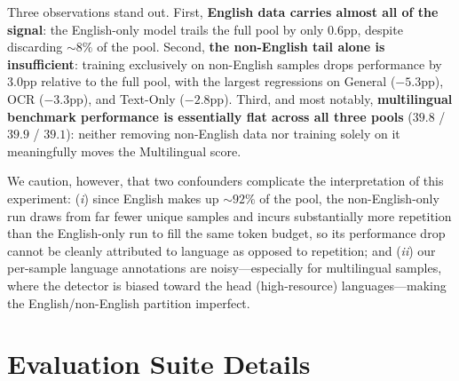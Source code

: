 Three observations stand out. First, \textbf{English data carries almost all of the signal}: the English-only model trails the full pool by only $0.6$pp, despite discarding ${\sim}8\%$ of the pool. Second, \textbf{the non-English tail alone is insufficient}: training exclusively on non-English samples drops performance by $3.0$pp relative to the full pool, with the largest regressions on General ($-5.3$pp), OCR ($-3.3$pp), and Text-Only ($-2.8$pp). Third, and most notably, \textbf{multilingual benchmark performance is essentially flat across all three pools} ($39.8$ / $39.9$ / $39.1$): neither removing non-English data nor training solely on it meaningfully moves the Multilingual score. 

We caution, however, that two confounders complicate the interpretation of this experiment: (\textit{i})
  since English makes up ${\sim}92\%$ of the pool, the non-English-only run draws from far fewer unique
  samples and incurs substantially more repetition than the English-only run to fill the same token budget, so
  its performance drop cannot be cleanly attributed to language as opposed to repetition; and (\textit{ii})
  our per-sample language annotations are noisy---especially for multilingual samples, where the detector is
  biased toward the head (high-resource) languages---making the English/non-English partition imperfect.


\clearpage

\section{Evaluation Suite Details}\label{app:eval_details}

